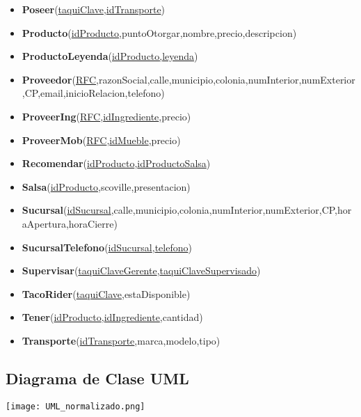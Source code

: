 \documentclass[11pt,letterpaper]{article}
\begin{document}
\begin{itemize}
\item \footnotesize{\textbf{Poseer}(\underline{taquiClave},\underline{idTransporte})}
\item \footnotesize{\textbf{Producto}(\underline{idProducto},puntoOtorgar,nombre,precio,descripcion)}
\item \footnotesize{\textbf{ProductoLeyenda}(\underline{idProducto,leyenda})}
\item \scriptsize{\textbf{Proveedor}(\underline{RFC},razonSocial,calle,municipio,colonia,numInterior,numExterior,CP,email,inicioRelacion,telefono)}
\item \footnotesize{\textbf{ProveerIng}(\underline{RFC},\underline{idIngrediente},precio)}
\item \footnotesize{\textbf{ProveerMob}(\underline{RFC},\underline{idMueble},precio)}
\item \footnotesize{\textbf{Recomendar}(\underline{idProducto},\underline{idProductoSalsa})}
\item \footnotesize{\textbf{Salsa}(\underline{idProducto},scoville,presentacion)}
\item {\footnotesize \textbf{Sucursal}(\underline{idSucursal},calle,municipio,colonia,numInterior,numExterior,CP,horaApertura,horaCierre)}
\item \footnotesize{\textbf{SucursalTelefono}(\underline{idSucursal},\underline{telefono})}
\item \footnotesize{\textbf{Supervisar}(\underline{taquiClaveGerente},\underline{taquiClaveSupervisado})}
\item \footnotesize{\textbf{TacoRider}(\underline{taquiClave},estaDisponible)}
\item \footnotesize{\textbf{Tener}(\underline{idProducto},\underline{idIngrediente},cantidad)}
\item \footnotesize{\textbf{Transporte}(\underline{idTransporte},marca,modelo,tipo)}

\end{itemize}
\subsection{Diagrama de Clase UML}

 \begin{landscape}
\begin{center}
\begin{minipage}{1\linewidth}
\texttt{[image: UML\_normalizado.png]}
\end{minipage}
\end{center}
\end{landscape}
\end{document}
